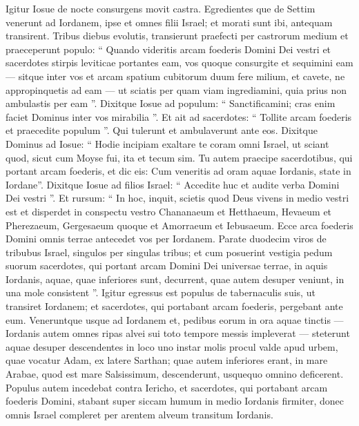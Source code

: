 \begin{biblechapter}
\begin{biblechapter}
\begin{biblechapter}
\verse Igitur Iosue de nocte consurgens movit castra. Egredientes que de Settim venerunt ad Iordanem, ipse et omnes filii Israel; et morati sunt ibi, antequam transirent. 
\verse Tribus diebus evolutis, transierunt praefecti per castrorum medium 
\verse et praeceperunt populo: “ Quando videritis arcam foederis Domini Dei vestri et sacerdotes stirpis leviticae portantes eam, vos quoque consurgite et sequimini eam 
\verse — sitque inter vos et arcam spatium cubitorum duum fere milium, et cavete, ne appropinquetis ad eam — ut sciatis per quam viam ingrediamini, quia prius non ambulastis per eam ”. 
\verse Dixitque Iosue ad populum: “ Sanctificamini; cras enim faciet Dominus inter vos mirabilia ”. 
\verse Et ait ad sacerdotes: “ Tollite arcam foederis et praecedite populum ”. Qui tulerunt et ambulaverunt ante eos.
 \verse Dixitque Dominus ad Iosue: “ Hodie incipiam exaltare te coram omni Israel, ut sciant quod, sicut cum Moyse fui, ita et tecum sim. 
\verse Tu autem praecipe sacerdotibus, qui portant arcam foederis, et dic eis: Cum veneritis ad oram aquae Iordanis, state in Iordane”. 
\verse Dixitque Iosue ad filios Israel: “ Accedite huc et audite verba Domini Dei vestri ”. 
\verse Et rursum: “ In hoc, inquit, scietis quod Deus vivens in medio vestri est et disperdet in conspectu vestro Chananaeum et Hetthaeum, Hevaeum et Pherezaeum, Gergesaeum quoque et Amorraeum et Iebusaeum. 
\verse Ecce arca foederis Domini omnis terrae antecedet vos per Iordanem. 
\verse Parate duodecim viros de tribubus Israel, singulos per singulas tribus; 
\verse et cum posuerint vestigia pedum suorum sacerdotes, qui portant arcam Domini Dei universae terrae, in aquis Iordanis, aquae, quae inferiores sunt, decurrent, quae autem desuper veniunt, in una mole consistent ”.
 \verse Igitur egressus est populus de tabernaculis suis, ut transiret Iordanem; et sacerdotes, qui portabant arcam foederis, pergebant ante eum. 
\verse Veneruntque usque ad Iordanem et, pedibus eorum in ora aquae tinctis — Iordanis autem omnes ripas alvei sui toto tempore messis impleverat — 
\verse steterunt aquae desuper descendentes in loco uno instar molis procul valde apud urbem, quae vocatur Adam, ex latere Sarthan; quae autem inferiores erant, in mare Arabae, quod est mare Salsissimum, descenderunt, usquequo omnino deficerent. 
\verse Populus autem incedebat contra Iericho, et sacerdotes, qui portabant arcam foederis Domini, stabant super siccam humum in medio Iordanis firmiter, donec omnis Israel compleret per arentem alveum transitum Iordanis.
 

\end{biblechapter}
\end{biblechapter}
\end{biblechapter}

